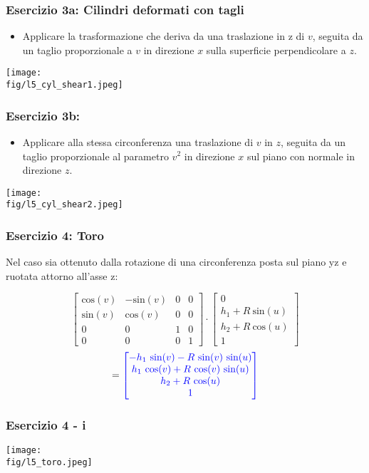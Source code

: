 \documentclass{beamer}
\newcommand{\fig}{./figures} %
\newcommand{\msin}{\mbox{sin}} %
\newcommand{\mcos}{\mbox{cos}} %
\begin{document}
\begin{frame}
\frametitle{Esercizio 3a: Cilindri deformati con tagli}
\begin{itemize}
\item Applicare la trasformazione che deriva da una traslazione in z di  $v$, seguita
da un taglio proporzionale a $v$ in direzione $x$ sulla superficie perpendicolare a
$z$. 
\end{itemize}
\begin{center}
\texttt{[image: \\fig/l5\_cyl\_shear1.jpeg]}
\end{center}
\end{frame}
\begin{frame}
\frametitle{Esercizio 3b:}
\begin{itemize}
\item Applicare alla stessa circonferenza una traslazione di $v$ in $z$,
seguita da un taglio proporzionale al parametro $v^2$ in direzione $x$ sul piano
con normale in direzione $z$.
\end{itemize}
\begin{center}
\texttt{[image: \\fig/l5\_cyl\_shear2.jpeg]}
\end{center}
\end{frame}
\begin{frame}
\frametitle{Esercizio 4: Toro}
Nel caso sia ottenuto dalla rotazione di una circonferenza posta sul piano yz e ruotata attorno all'asse z:
\begin{center}
\begin{displaymath}
\begin{bmatrix}
\mcos(v) & -\msin(v) & 0 & 0  \\
\msin(v) &  \mcos(v) & 0 & 0  \\
0        &  0        & 1 & 0  \\
0        &  0        & 0 & 1
\end{bmatrix}
\cdot
\begin{bmatrix}
0 \\
h_1+R~\msin(u)\\
h_2+R~\mcos(u)\\
1
\end{bmatrix}
\end{displaymath}
\begin{displaymath}
={\color{blue} 
\begin{bmatrix}
-h_1~\msin(v)- R ~\msin(v)~\msin(u)\\
h_1~\mcos(v) + R~\mcos(v)~\msin(u)\\
h_2+R~\mcos(u)\\
1
\end{bmatrix}}
\end{displaymath}
\end{center}
\end{frame}
\begin{frame}
\frametitle{Esercizio 4 - i}
\texttt{[image: \\fig/l5\_toro.jpeg]}
\end{frame}
\end{document}
